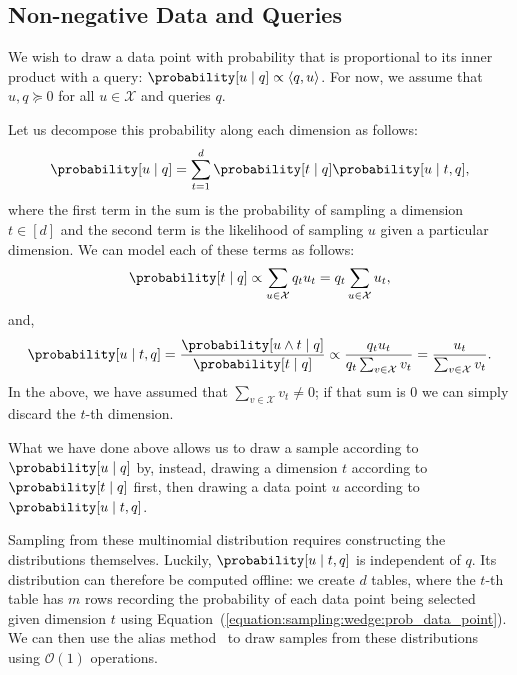 \subsection{Non-negative Data and Queries}
We wish to draw a data point with probability that is proportional to its inner
product with a query: $\probability[u \;|\; q] \propto \langle q, u \rangle$.
For now, we assume that $u, q \succeq 0$ for all $u \in \mathcal{X}$ and queries $q$.

Let us decompose this probability along each dimension as follows:
\begin{equation}
    \probability[u \;|\; q] = \sum_{t = 1}^d \probability[t \;|\; q] \probability[u \;|\; t, q],
\end{equation}
where the first term in the sum is the probability of sampling a dimension $t \in [d]$
and the second term is the likelihood of sampling $u$ given a particular dimension.
We can model each of these terms as follows:
\begin{equation}
    \label{equation:sampling:wedge:prob_dimension}
    \probability[t \;|\; q] \propto \sum_{u \in \mathcal{X}} q_t u_t = q_t \sum_{u \in \mathcal{X}} u_t,
\end{equation}
and,
\begin{equation}
    \label{equation:sampling:wedge:prob_data_point}
    \probability[u \;|\; t, q] = \frac{\probability[u \land t \;|\; q]}{\probability[t \;|\; q]}
    \propto \frac{q_t u_t}{q_t \sum_{v \in \mathcal{X}} v_t} = \frac{u_t}{\sum_{v \in \mathcal{X}} v_t}.
\end{equation}
In the above, we have assumed that $\sum_{v \in \mathcal{X}} v_t \neq 0$; if that sum is $0$
we can simply discard the $t$-th dimension.

What we have done above allows us to draw a sample according to $\probability[u \;|\; q]$
by, instead, drawing a dimension $t$ according to $\probability[t \;|\; q]$ first,
then drawing a data point $u$ according to $\probability[u \;|\; t, q]$.

Sampling from these multinomial distribution requires constructing the distributions themselves.
Luckily, $\probability[u \;|\; t, q]$ is independent of $q$.
Its distribution can therefore be computed offline: we create $d$ tables,
where the $t$-th table has $m$ rows recording the probability of each data point
being selected given dimension $t$ using Equation~(\ref{equation:sampling:wedge:prob_data_point}).
We can then use the alias method~\citep{Walker1977theAliasMethod} to draw samples
from these distributions using $\mathcal{O}(1)$ operations.

